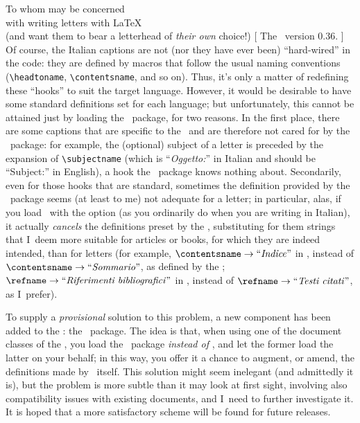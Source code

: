 \begin{letterhead}{
	To whom may be concerned\\
	with writing letters with \LaTeX\\
	(and want them to bear a letterhead
	of \emph{their own} choice!)
}[
	The \Bundle\ version 0.36.
]
Of course, the Italian captions are not (nor they have ever been) ``hard-wired''
in the code: they are defined by macros that follow the usual naming conventions
(\verb|\headtoname|, \verb|\contentsname|, and so on).  Thus, it's only a matter
of redefining these ``hooks'' to suit the target language.  However, it would be
desirable to have some standard definitions set for each language; but
unfortunately, this cannot be attained just by loading the \babel\ package, for
two reasons.  In the first place, there are some captions that are specific to
the \Bundle\ and are therefore not cared for by the \babel\ package: for
example, the (optional) subject of a letter is preceded by the expansion of
\verb|\subjectname| (which is ``\emph{Oggetto:}'' in Italian and should be
``Subject:'' in English), a hook the \babel\ package knows nothing about.
Secondarily, even for those hooks that are standard, sometimes the definition
provided by the \babel\ package seems (at least to me) not adequate for a
letter; in particular, alas, if you load \babel\ with the  option
(as you ordinarily do when you are writing in Italian), it actually
\emph{cancels} the definitions preset by the \Bundle, substituting for them
strings that I~deem more suitable for articles or books, for which they are
indeed intended, than for letters (for example, \( \verb|\contentsname| \to
\mbox{``\emph{Indice}''} \) in \babel, instead of \( \verb|\contentsname| \to
\mbox{``\emph{Sommario}''} \), as defined by the \Bundle; \( \verb|\refname| \to
\mbox{``\emph{Riferimenti bibliografici}''} \) in \babel, instead of \(
\verb|\refname| \to \mbox{``\emph{Testi citati}''} \), as I~prefer).

To supply a \emph{provisional} solution to this problem, a new component has
been added to the \Bundle: the \cdpbabel\ package.  The idea is that, when using
one of the document classes of the \Bundle, you load the \cdpbabel\ package
\emph{instead of} \babel, and let the former load the latter on your behalf; in
this way, you offer it a chance to augment, or amend, the definitions made by
\babel\ itself.  This solution might seem inelegant (and admittedly it is), but
the problem is more subtle than it may look at first sight, involving also
compatibility issues with existing documents, and I~need to further investigate
it.  It is hoped that a more satisfactory scheme will be found for future
releases.


\end{letterhead}
